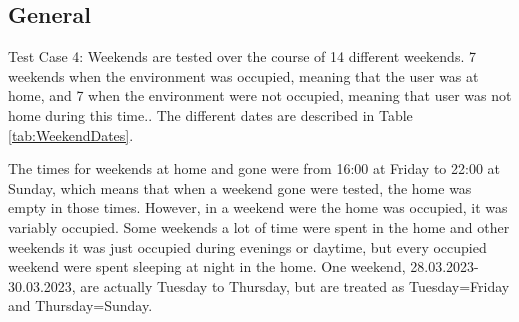 \subsection{General}
Test Case 4: Weekends are tested over the course of 14 different weekends. 7 weekends when the environment was occupied, meaning that the user was at home, and 7 when the environment were not occupied, meaning that user was not home during this time.. The different dates are described in Table \ref{tab:WeekendDates}. 
\begin{table}[H]
    \centering
    \caption{Dates for Test Case 4: Weekends}
    \label{tab:WeekendDates}
\end{table}

The times for weekends at home and gone were from 16:00 at Friday to 22:00 at Sunday, which means that when a weekend gone were tested, the home was empty in those times. However, in a weekend were the home was occupied, it was variably occupied. Some weekends a lot of time were spent in the home and other weekends it was just occupied during evenings or daytime, but every occupied weekend were spent sleeping at night in the home. One weekend, 28.03.2023-30.03.2023, are actually Tuesday to Thursday, but are treated as Tuesday=Friday and Thursday=Sunday. 

